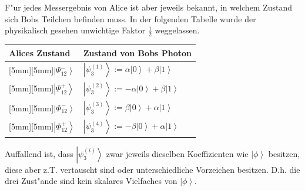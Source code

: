 \begin{refsection}
F"ur jedes Messergebnis von Alice ist aber jeweils bekannt, in welchem Zustand sich Bobs Teilchen befinden muss. In der folgenden Tabelle wurde der physikalisch gesehen unwichtige Faktor $\frac{1}{2}$ weggelassen.
\begin{center}
   \begin{tabular}{| l | l |}
   \hline
   Alices Zustand & Zustand von Bobs Photon \\
    \hline
     \raisebox{0mm}[5mm][5mm]{}$\left| \Psi_{12}^{-} \right\rangle$ & $ \left| \psi_{3}^{(1)} \right\rangle := \alpha \left| 0 \right \rangle + \beta \left| 1 \right \rangle $ \\ \hline
     \raisebox{0mm}[5mm][5mm]{}$\left| \Psi_{12}^{+} \right\rangle$ & $ \left| \psi_{3}^{(2)} \right\rangle := -\alpha \left| 0 \right \rangle + \beta \left| 1 \right \rangle $ \\ \hline
     \raisebox{0mm}[5mm][5mm]{}$\left| \Phi_{12}^{-} \right\rangle$ & $ \left| \psi_{3}^{(3)} \right\rangle := \beta \left| 0 \right \rangle + \alpha \left| 1 \right \rangle $ \\ \hline
     \raisebox{0mm}[5mm][5mm]{}$\left| \Phi_{12}^{+} \right\rangle$ & $ \left| \psi_{3}^{(4)} \right\rangle := -\beta \left| 0 \right \rangle + \alpha \left| 1 \right \rangle $ \\ \hline
   \end{tabular}
\end{center}
Auffallend ist, dass $\left| \psi_{3}^{(i)} \right\rangle$ zwar jeweils dieselben Koeffizienten wie $\left| \phi \right\rangle$ besitzen, diese aber z.T. vertauscht sind oder unterschiedliche Vorzeichen besitzen. D.h. die drei Zust"ande sind kein skalares Vielfaches von $\left| \phi \right\rangle$.


\end{refsection}
